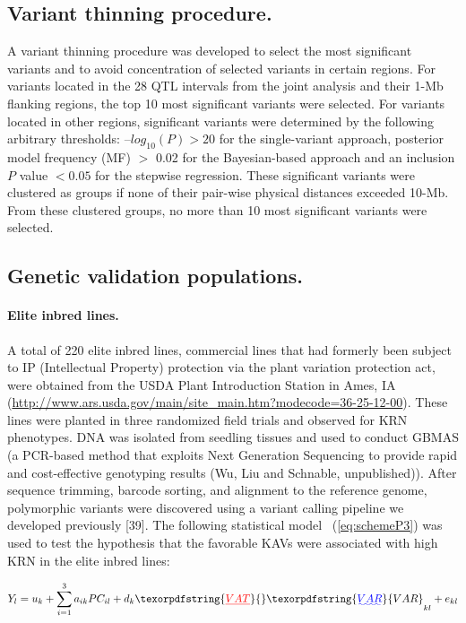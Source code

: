 \documentclass[10pt,letterpaper]{article}
\providecommand{\DIFaddtex}[1]{{\protect\color{blue}\uwave{#1}}} %
\providecommand{\DIFdeltex}[1]{{\protect\color{red}\sout{#1}}}                      %
\providecommand{\DIFaddbegin}{} %
\providecommand{\DIFaddend}{} %
\providecommand{\DIFdelbegin}{} %
\providecommand{\DIFdelend}{} %
\providecommand{\DIFadd}[1]{\texorpdfstring{\DIFaddtex{#1}}{#1}} %
\providecommand{\DIFdel}[1]{\texorpdfstring{\DIFdeltex{#1}}{}} %
\begin{document}
\subsection*{Variant thinning procedure.}
A variant thinning procedure was developed to select the most significant variants and to avoid concentration of selected variants in certain regions. For variants located in the 28 QTL intervals from the joint analysis and their 1-Mb flanking regions, the top 10 most significant variants were selected. For variants located in other regions, significant variants were determined by the following arbitrary thresholds: $–log_{10}(P) > 20$ for the single-variant approach, posterior model frequency (MF) $>$ 0.02 for the Bayesian-based approach and an inclusion $P$ value $< 0.05$ for the stepwise regression. These significant variants were clustered as groups if none of their pair-wise physical distances exceeded 10-Mb. From these clustered groups, no more than 10 most significant variants were selected.        

\subsection*{Genetic validation populations.} 
\paragraph{Elite inbred lines.}

A total of 220 elite inbred lines, commercial lines that had formerly been subject to IP (Intellectual Property) protection via the plant variation protection act, were obtained from the USDA Plant Introduction Station in Ames, IA (\url{http://www.ars.usda.gov/main/site_main.htm?modecode=36-25-12-00}). These lines were planted in three randomized field trials and observed for KRN phenotypes. DNA was isolated from seedling tissues and used to conduct GBMAS (a PCR-based method that exploits Next Generation Sequencing to provide rapid and cost-effective genotyping results (Wu, Liu and Schnable, unpublished)). After sequence trimming, barcode sorting, and alignment to the reference genome, polymorphic variants were discovered using a variant calling pipeline we developed previously [39].
%
The following statistical model ~(\ref{eq:schemeP3}) was used to test the hypothesis that the favorable KAVs were associated with high KRN in the elite inbred lines:

\begin{equation}\label{eq:schemeP3} 
Y_l = u_k + \sum_{i=1}^3 a_{ik}PC_{il} + d_k\DIFdelbegin \DIFdel{VAT}\DIFdelend \DIFaddbegin \DIFadd{VAR}\DIFaddend _{kl} + e_{kl}
\end{equation}
\end{document}
